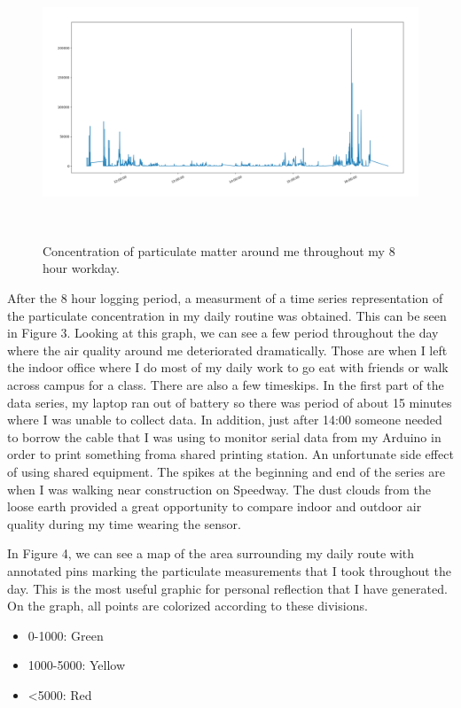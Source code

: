 \documentclass{sigchi}
\begin{document}
\begin{figure}
\centering
  \includegraphics[width=1\columnwidth]{figures/concentration}
  \caption{ Concentration of particulate matter around me throughout my 8 hour workday.
  }~\label{fig:figure3}
\end{figure}

After the 8 hour logging period, a measurment of a time series representation of
the particulate concentration in my daily routine was obtained. This can be seen in Figure 3.
Looking at this graph, we can see a few period throughout the day where the air quality around
me deteriorated dramatically. Those are when I left the indoor office where I do
most of my daily work to go eat with friends or walk across campus for a class.
There are also a few timeskips. In the first part of the data series, my laptop
ran out of battery so there was period of about 15 minutes where I was unable to collect data.
In addition, just after 14:00 someone needed to borrow the cable that I was using
to monitor serial data from my Arduino in order to print something froma shared
printing station. An unfortunate side effect of using shared equipment.
The spikes at the beginning and end of the series are when I was walking near construction
on Speedway. The dust clouds from the loose earth provided a great opportunity to compare
indoor and outdoor air quality during my time wearing the sensor.

In Figure 4, we can see a map of the area surrounding my daily route with annotated pins
marking the particulate measurements that I took throughout the day. This is the most
useful graphic for personal reflection that I have generated. On the graph, all points
are colorized according to these divisions. \cite{mapper}

\begin{itemize}
\item 0-1000: Green
\item 1000-5000: Yellow
\item <5000: Red
\end{itemize}
\end{document}
